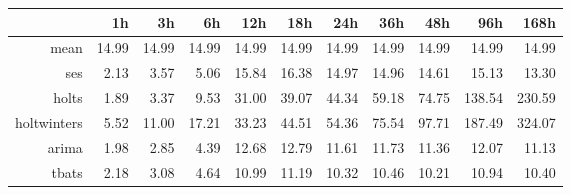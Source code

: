 \begin{table}[ht]
\centering
\begin{tabular}{rrrrrrrrrrr}
  \hline
 & 1h & 3h & 6h & 12h & 18h & 24h & 36h & 48h & 96h & 168h \\ 
  \hline
mean & 14.99 & 14.99 & 14.99 & 14.99 & 14.99 & 14.99 & 14.99 & 14.99 & 14.99 & 14.99 \\ 
  ses & 2.13 & 3.57 & 5.06 & 15.84 & 16.38 & 14.97 & 14.96 & 14.61 & 15.13 & 13.30 \\ 
  holts & 1.89 & 3.37 & 9.53 & 31.00 & 39.07 & 44.34 & 59.18 & 74.75 & 138.54 & 230.59 \\ 
  holtwinters & 5.52 & 11.00 & 17.21 & 33.23 & 44.51 & 54.36 & 75.54 & 97.71 & 187.49 & 324.07 \\ 
  arima & 1.98 & 2.85 & 4.39 & 12.68 & 12.79 & 11.61 & 11.73 & 11.36 & 12.07 & 11.13 \\ 
  tbats & 2.18 & 3.08 & 4.64 & 10.99 & 11.19 & 10.32 & 10.46 & 10.21 & 10.94 & 10.40 \\ 
   \hline
\end{tabular}
\end{table}

